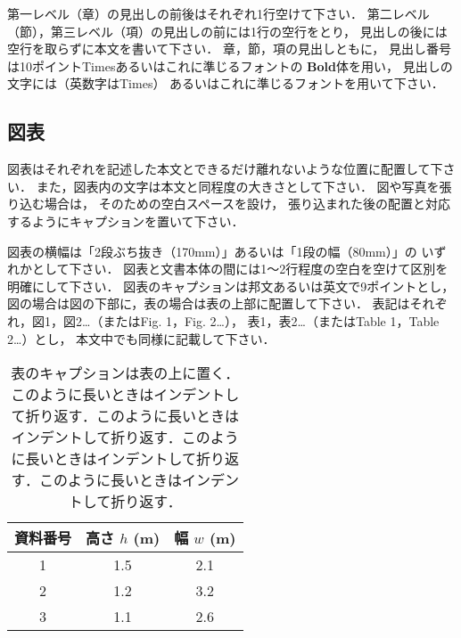 \documentclass[main]{subfiles}
\begin{document}
            第一レベル（章）の見出しの前後はそれぞれ1行空けて下さい．
            第二レベル（節），第三レベル（項）の見出しの前には1行の空行をとり，
            見出しの後には空行を取らずに本文を書いて下さい．
            章，節，項の見出しともに，
            見出し番号は10ポイントTimesあるいはこれに準じるフォントの
            \textbf{Bold}体を用い，
            見出しの文字には（英数字はTimes）
            あるいはこれに準じるフォントを用いて下さい．
    
    \subsection{図表}
    
        図表はそれぞれを記述した本文とできるだけ離れないような位置に配置して下さい．
        また，図表内の文字は本文と同程度の大きさとして下さい．
        図や写真を張り込む場合は，
        そのための空白スペースを設け，
        張り込まれた後の配置と対応するようにキャプションを置いて下さい．
    
        図表の横幅は「2段ぶち抜き（170mm）」あるいは「1段の幅（80mm）」の
        いずれかとして下さい．
        図表と文書本体の間には1〜2行程度の空白を空けて区別を明確にして下さい．
        図表のキャプションは邦文あるいは英文で9ポイントとし，
        図の場合は図の下部に，表の場合は表の上部に配置して下さい．
        表記はそれぞれ，図1，図2\ldots（またはFig. 1，Fig. 2\ldots），
        表1，表2\ldots（またはTable 1，Table 2\ldots）とし，
        本文中でも同様に記載して下さい．
    
        \begin{table}[t]
            \caption{表のキャプションは表の上に置く．
                このように長いときはインデントして折り返す．このように長いときはインデントして折り返す．このように長いときはインデントして折り返す．このように長いときはインデントして折り返す．}
            \label{TableSample}
            \begin{center}
                \begin{tabular}{c|c|c}\hline\hline
                    資料番号 & 高さ $h$ (m) & 幅 $w$ (m) \\\hline
                    1    & 1.5        & 2.1       \\
                    2    & 1.2        & 3.2       \\
                    3    & 1.1        & 2.6       \\\hline\hline
                \end{tabular}
            \end{center}
        \end{table}
    
\end{document}
